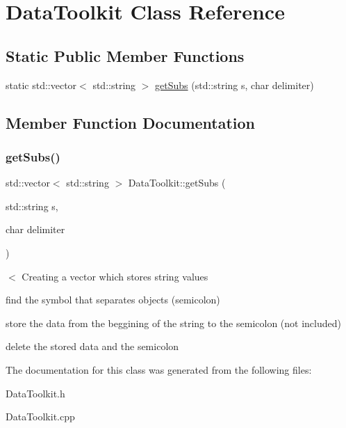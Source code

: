 \hypertarget{class_data_toolkit}{}\section{Data\+Toolkit Class Reference}
\label{class_data_toolkit}
\subsection*{Static Public Member Functions}
\begin{DoxyCompactItemize}
\item 
static std\+::vector$<$ std\+::string $>$ \mbox{\hyperlink{class_data_toolkit_aca86f00861be433066ed7d5f3962c387}{get\+Subs}} (std\+::string s, char delimiter)
\end{DoxyCompactItemize}


\subsection{Member Function Documentation}
\mbox{\label{class_data_toolkit_aca86f00861be433066ed7d5f3962c387}} 
\subsubsection{\texorpdfstring{get\+Subs()}{getSubs()}}
{\footnotesize\ttfamily std\+::vector$<$ std\+::string $>$ Data\+Toolkit\+::get\+Subs (\begin{DoxyParamCaption}\item[{std\+::string}]{s,  }\item[{char}]{delimiter }\end{DoxyParamCaption})\hspace{0.3cm}{\ttfamily [static]}}

$<$ Creating a vector which stores string values

find the symbol that separates objects (semicolon)

store the data from the beggining of the string to the semicolon (not included)

delete the stored data and the semicolon 

The documentation for this class was generated from the following files\+:\begin{DoxyCompactItemize}
\item 
Data\+Toolkit.\+h\item 
Data\+Toolkit.\+cpp\end{DoxyCompactItemize}
